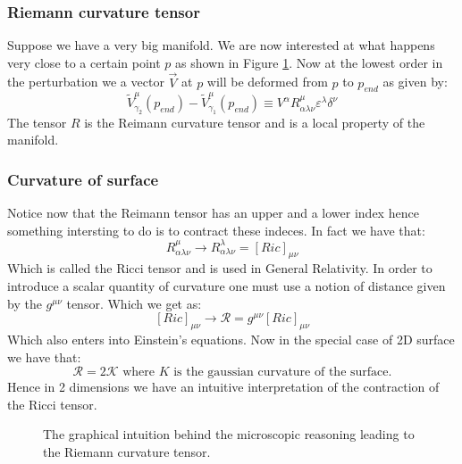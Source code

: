 \documentclass[10pt,a4paper]{book}
\begin{document}
\subsubsection{Riemann curvature tensor}
Suppose we have a very big manifold. We are now interested at what happens very close to a certain point $p$ as shown in Figure \ref{reimann-curvature}. Now at the lowest order in the perturbation we a vector $\overrightarrow{V}$ at $p$ will be deformed from $p$ to $p_{end}$ as given by:
\[
\tilde{V}^\mu_{\gamma_2} (p_{end}) - \tilde{V}^\mu_{\gamma_1}(p_{end}) \equiv V^\alpha R_{\alpha \lambda \nu}^{\mu} \varepsilon^\lambda \delta^\nu
\]
The tensor $R$ is the Reimann curvature tensor and is a local property of the manifold.

\subsubsection{Curvature of surface}
Notice now that the Reimann tensor has an upper and a lower index hence something intersting to do is to contract these indeces. In fact we have that:
\[
R_{\alpha \lambda \nu}^\mu \to R_{\alpha \lambda \nu}^\lambda = [Ric]_{\mu \nu}
\]
Which is called the Ricci tensor and is used in General Relativity. In order to introduce a scalar quantity of curvature one must use a notion of distance given by the $g^{\mu \nu}$ tensor. Which we get as:
\[
[Ric]_{\mu \nu} \to \mathcal{R} = g^{\mu \nu} [Ric]_{\mu \nu}
\] 
Which also enters into Einstein's equations. Now in the special case of 2D surface we have that:
\[
\mathcal{R} = 2 \mathcal{K} \text{ where } K \text{ is the gaussian curvature of the surface.}
\]
Hence in 2 dimensions we have an intuitive interpretation of the contraction of the Ricci tensor. 


\begin{figure} [h]
\label{reimann-curvature}
\centering
{}
\caption{The graphical intuition behind the microscopic reasoning leading to the Riemann curvature tensor.}
\end{figure}
\end{document}
